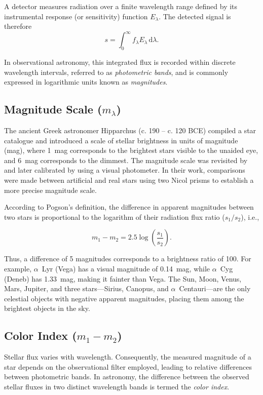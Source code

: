 A detector measures radiation over a finite wavelength range defined by its instrumental response (or sensitivity) function $E_\lambda$. The detected signal is therefore
\begin{equation}
s = \int_0^\infty f_\lambda E_\lambda \, \mathrm{d}\lambda .
\end{equation}

In observational astronomy, this integrated flux is recorded within discrete wavelength intervals,
referred to as \textit{photometric bands}, and is commonly expressed in logarithmic units known as \textit{magnitudes}.

\subsection{Magnitude Scale ($m_\lambda$)}
The ancient Greek astronomer Hipparchus (c. 190 – c. 120 BCE) compiled a star catalogue and introduced a scale of stellar brightness in units of magnitude (mag), where 1~mag corresponds to the brightest stars visible to the unaided eye, and 6~mag corresponds to the dimmest. The magnitude scale was revisited by \cite{1856pogson} and later calibrated by \cite{1861zoellner} using a visual photometer. In their work, comparisons were made between artificial and real stars using two Nicol prisms to establish a more precise magnitude scale.  

According to Pogson's definition, the difference in apparent magnitudes between two stars is proportional to the logarithm of their radiation flux ratio ($s_1/s_2$), i.e.,

\begin{equation}
m_1 - m_2 = 2.5 \log\left(\frac{s_1}{s_2}\right).
\end{equation}

Thus, a difference of 5 magnitudes corresponds to a brightness ratio of 100. For example, $\alpha$~Lyr (Vega) has a visual magnitude of 0.14~mag, while $\alpha$~Cyg (Deneb) has 1.33~mag, making it fainter than Vega. The Sun, Moon, Venus, Mars, Jupiter, and three stars—Sirius, Canopus, and $\alpha$~Centauri—are the only celestial objects with negative apparent magnitudes, placing them among the brightest objects in the sky.


\subsection{Color Index ($m_1 - m_2$)}

Stellar flux varies with wavelength. Consequently, the measured magnitude of a star depends on the observational filter employed, leading to relative differences between photometric bands. In astronomy, the difference between the observed stellar fluxes in two distinct wavelength bands is termed the \emph{color index}.

